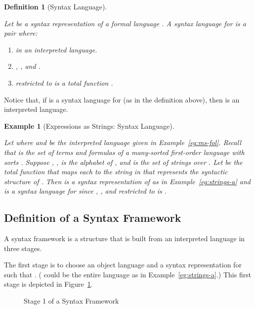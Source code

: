 \documentclass[11pt,fleqn]{article}
\newcommand{\be}{\begin{enumerate}}
\newcommand{\ee}{\end{enumerate}}
\newcommand{\bsp}{\begin{sloppypar}}
\newcommand{\esp}{\end{sloppypar}}
\newtheorem{eg}[thm]{Example}
\newtheorem{df}[thm]{Definition}
\begin{document}
\begin{df}[Syntax Language] \label{df:syn-lang} \em \bsp
Let  be a syntax representation of a
formal language .  A \emph{syntax language} for  is a pair
 where:

\be

  \item  in an interpreted language.

  \item , , and
    .

  \item  restricted to  is a total function
    . \hfill 

\ee
\esp
\end{df}
Notice that, if  is a syntax language for  (as
in the definition above), then  is an
interpreted language.

\begin{eg}[Expressions as Strings: Syntax Language] \label{eg:strings-b} \em
\bsp Let  where  and  be the interpreted language given in Example~\ref{eg:ms-fol}.
Recall that  is the set of terms and formulas of a many-sorted
first-order language with sorts .  Suppose
, ,  is the
alphabet of , and  is the set of strings over .  Let  be the total function that maps each  to the
string in  that represents the syntactic structure of .  Then
 is a syntax representation of  as in
Example~\ref{eg:strings-a} and  is a syntax language for 
since , , and  restricted to
 is . \hfill  \esp
\end{eg}

\subsection{Definition of a Syntax Framework} \label{subsec:frameworks}

A syntax framework is a structure that is built from an interpreted
language  in three stages.  

The first stage is to choose an object language  and a syntax representation  for
 such that .  ( could be the entire language  as in
Example~\ref{eg:strings-a}.)  This first stage is depicted in
Figure~\ref{fig:syn-frame-stage-1}.

\begin{figure}
\center
{}
\caption{Stage 1 of a Syntax Framework}  \label{fig:syn-frame-stage-1}
\end{figure}
\end{document}
